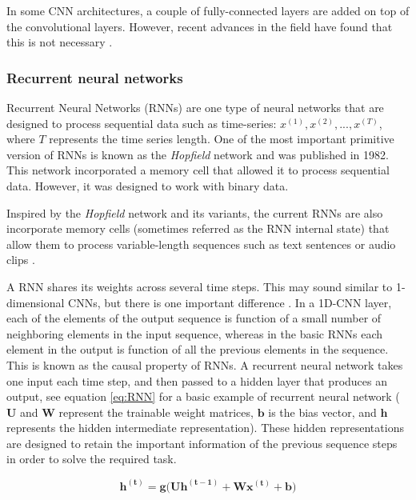 In some CNN architectures, a couple of fully-connected layers are added on top of the convolutional layers. However, recent advances in the field have found that this is not necessary \autocite{shelhamer2015}.


\subsubsection{Recurrent neural networks}
\sloppy Recurrent Neural Networks (RNNs) are one type of neural networks that are designed to process sequential data such as time-series: $x^{(1)}, x^{(2)}, ..., x^{(T)}$, where $T$ represents the time series length. One of the most important primitive version of RNNs is known as the \textit{Hopfield} network \autocite{hopfield1982} and was published in 1982. This network incorporated a memory cell that allowed it to process sequential data. However, it was designed to work with binary data.

Inspired by the \textit{Hopfield} network and its variants, the current RNNs are also incorporate memory cells (sometimes referred as the RNN internal state) that allow them to process variable-length sequences such as text sentences or audio clips \autocite{haykin1998}.

A RNN shares its weights across several time steps. This may sound similar to 1-dimensional CNNs, but there is one important difference \autocite{Goodfellow2016}. In a 1D-CNN layer, each of the elements of the output sequence is function of a small number of neighboring elements in the input sequence, whereas in the basic RNNs each element in the output is function of all the previous elements in the sequence. This is known as the causal property of RNNs. A recurrent neural network takes one input each time step, and then passed to a hidden layer that produces an output, see equation \ref{eq:RNN} for a basic example of recurrent neural network ($\mathbf{U}$ and $\mathbf{W}$ represent the trainable weight matrices, $\mathbf{b}$ is the bias vector, and $\mathbf{h}$ represents the hidden intermediate representation). These hidden representations are designed to retain the important information of the previous sequence steps in order to solve the required task.

\begin{equation}
\label{eq:RNN}
\mathbf{h^{( t )}} = \mathbf{g(U h^{( t-1 )}} + \mathbf{W x^{( t )}} + \mathbf{b})
\end{equation}

